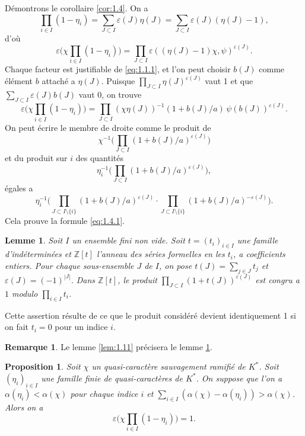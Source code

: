 \documentclass[12pt,a4paper]{article}
\theoremstyle{plain}
\newtheorem{lemma}[theorem]{Lemme}
\newtheorem{proposition}[theorem]{Proposition}
\theoremstyle{definition}
\newtheorem{remark}[theorem]{Remarque}
\theoremstyle{remark}
\newcommand{\bZ}{\mathbb{Z}}
\begin{document}
D\'emontrons le corollaire \ref{cor:1.4}. On a
\[
\prod_{i \in I}(1-\eta_i) = \sum_{J \subset I} \varepsilon(J) \eta(J) = \sum_{J \subset I} \varepsilon(J)(\eta(J)-1),
\]
d'o\`u
\[
\varepsilon\biggl(\chi \prod_{i \in I}(1-\eta_i)\biggr) = \prod_{J \subset I} \varepsilon((\eta(J)-1)\chi, \psi)^{\varepsilon(J)}.
\]
Chaque facteur est justifiable de \eqref{eq:1.1.1}, et l'on peut choisir $b(J)$ comme \'el\'ement $b$ attach\'e a $\eta(J)$. Puisque $\prod_{J \subset I} \eta(J)^{\varepsilon(J)}$ vaut 1 et que $\sum_{J \subset I} \varepsilon(J) b(J)$ vaut 0, on trouve
\[
\varepsilon\biggl(\chi \prod_{i \in I}(1-\eta_i)\biggr) = \prod_{J \subset I} (\chi\eta(J))^{-1}(1+b(J)/a) \, \psi(b(J))^{\varepsilon(J)}.
\]
On peut \'ecrire le membre de droite comme le produit de
\[
\chi^{-1}\biggl(\prod_{J \subset I} (1+b(J)/a)^{\varepsilon(J)}\biggr)
\]
et du produit sur $i$ des quantit\'es
\[
\eta_i^{-1}\biggl(\prod_{J \subset I} (1+b(J)/a)^{\varepsilon(J)}\biggr),
\]
\'egales a
\[
\eta_i^{-1}\biggl(\prod_{J \subset I \setminus \{i\}} (1+b(J)/a)^{\varepsilon(J)} \cdot \prod_{J \subset I \setminus \{i\}} (1+b(J)/a)^{-\varepsilon(J)}\biggr).
\]
Cela prouve la formule \eqref{eq:1.4.1}.

\begin{lemma}\label{lem:1.6}
Soit $I$ un ensemble fini non vide. Soit $t = (t_i)_{i \in I}$ une famille d'ind\'etermin\'ees et $\bZ[t]$ l'anneau des s\'eries formelles en les $t_i$, a coefficients entiers. Pour chaque sous-ensemble $J$ de $I$, on pose $t(J) = \sum_{j \in J} t_j$ et $\varepsilon(J) = (-1)^{|J|}$. Dans $\bZ[t]$, le produit $\prod_{J \subset I} (1+t(J))^{\varepsilon(J)}$ est congru a $1$ modulo $\prod_{i \in I} t_i$.
\end{lemma}

Cette assertion r\'esulte de ce que le produit consid\'er\'e devient identiquement 1 si on fait $t_i = 0$ pour un indice $i$.

\begin{remark}
Le lemme \ref{lem:1.11} pr\'ecisera le lemme \ref{lem:1.6}.
\end{remark}

\begin{proposition}\label{prop:1.7}
Soit $\chi$ un quasi-caract\`ere sauvagement ramifi\'e de $K^*$. Soit $(\eta_i)_{i \in I}$ une famille finie de quasi-caract\`eres de $K^*$. On suppose que l'on a $\alpha(\eta_i) < \alpha(\chi)$ pour chaque indice $i$ et $\sum_{i \in I}(\alpha(\chi) - \alpha(\eta_i)) > \alpha(\chi)$. Alors on a
\[
\varepsilon\biggl(\chi \prod_{i \in I}(1-\eta_i)\biggr) = 1.
\]
\end{proposition}
\end{document}
